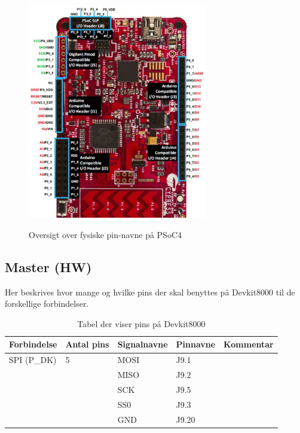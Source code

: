 \begin{figure}[H]
\centering
{\includegraphics[width=0.7\textwidth]{filer/design/Billeder/psoc4_pin}}
\caption{Oversigt over fysiske pin-navne på PSoC4}
\label{lab:psoc4_pin}
\end{figure}

\newpage
\begin{table}[H]
\subsection{Master (HW)}
Her beskrives hvor mange og hvilke pins der skal benyttes på Devkit8000 til de forskellige forbindelser.
\caption{Tabel der viser pins på Devkit8000}
\begin{small}
\begin{tabular}{|p{}|p{2cm}|p{}|p{}|p{2.6cm}|}
\hline

\textbf{Forbindelse}	&\textbf{Antal pins} 	&\textbf{Signalnavne} &\textbf{Pinnavne} &\textbf{Kommentar}  \\ \hline

SPI 	(P\_DK)			&5 						&MOSI				&J9.1		&					\\\cline{3-4}
					&						&MISO				&J9.2		&					\\\cline{3-4}
					&						&SCK					&J9.5		&					\\\cline{3-4}
					&						&SS0					&J9.3		&					\\\cline{3-4}					
					&						&GND					&J9.20		&					\\\hline

\end{tabular}
\end{small}
\label{table:master_forbindelse}
\end{table}

